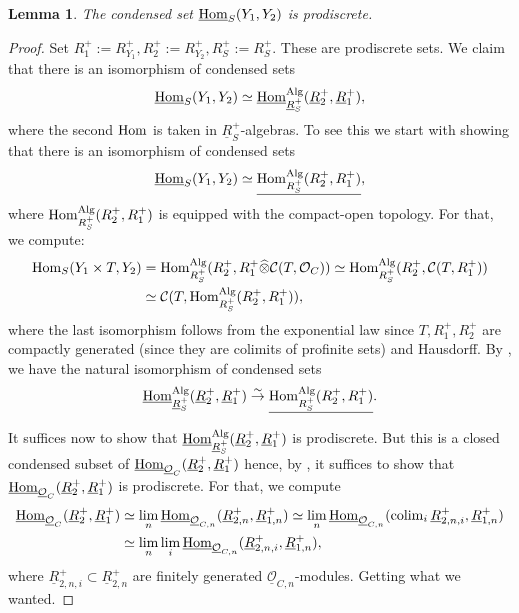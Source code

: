 \documentclass[10pt]{amsart}
\newtheorem{lemma}[equation]{Lemma}
\theoremstyle{definition}
\theoremstyle{remark}
\newcommand{\colim}{\operatorname{colim} }
\newcommand{\Hom}{{\rm{Hom}} }
\newcommand{\uHom}{\underline{{\rm{Hom}} }}
\newcommand{\scc}{{\mathcal{C}}}
\newcommand{\so}{{\mathcal O}}
\newcommand{\wh}{\widehat}
\numberwithin{equation}{section}
\numberwithin{equation}{section}
\begin{document}
\begin{lemma}\label{prodiscrete} 
The condensed set $ \uHom_S(Y_1,Y_2)$  is prodiscrete.
\end{lemma}
 \begin{proof}
 Set $R^+_1:= R^+_{Y_1}, R^+_2:= R^+_{Y_2}, R^+_S:= R^+_{S}$. These are prodiscrete sets. 
We claim that there is an isomorphism of condensed sets
 $$
  \uHom_S(Y_1,Y_2)\simeq   \underline{\Hom}_{\underline{R}^+_S}^{\rm Alg}(\underline{R}^+_2, \underline{R}^+_1),
 $$
 where the second $\Hom$ is taken in $\underline{R}^+_S$-algebras. 
 To see this we start with showing that  there is an isomorphism of condensed sets
 $$
   \uHom_S(Y_1,Y_2)\simeq  \underline{\Hom_{R^+_S}^{\rm Alg}(R^+_2, R^+_1)},
 $$
  where $ \Hom_{R^+_S}^{\rm Alg}(R^+_2, R^+_1)$ is equipped with the compact-open topology. For that, we compute:
 \begin{align*}
 \Hom_S(Y_1\times T,Y_2) & =\Hom_{R^+_S}^{\rm Alg}(R^+_2, R^+_1\wh{\otimes}\scc(T,\so_C))\simeq \Hom_{R^+_S}^{\rm Alg}(R^+_2, \scc(T,R^+_1))\\
  & \simeq \scc(T, \Hom_{R^+_S}^{\rm Alg}(R^+_2, R^+_1)),
 \end{align*}
  where  the last  isomorphism follows from the exponential law since $T, R^+_1, R^+_2$ are compactly generated  (since they are colimits of profinite sets) 
 and Hausdorff. 
By \cite[Prop. 4.2]{Sch19},  we have  the natural isomorphism of condensed sets $$
 \underline{\Hom}_{\underline{R}^+_S}^{\rm Alg}(\underline{R}^+_2, \underline{R}^+_1)\stackrel{\sim}{\to} 
 \underline{\Hom_{R^+_S}^{\rm Alg}(R^+_2, R^+_1)}.
 $$
 
  It suffices now to show that $\underline{\Hom}_{\underline{R}^+_S}^{\rm Alg}(\underline{R}^+_2, \underline{R}^+_1)$ is prodiscrete.   But this  is a closed condensed subset of 
  $ \uHom_{\underline{\so}_C}(\underline{R}^+_2,\underline{R}^+_1)$  hence, by \cite{MO},  it suffices to show that  $ \uHom_{\underline{\so}_C}(\underline{R}^+_2,\underline{R}^+_1)$ is prodiscrete. For that, we compute
 \begin{align*}
 \uHom_{\underline{\so}_C}(\underline{R}^+_2,\underline{R}^+_1) & \simeq \lim_n \uHom_{\underline{\so}_{C,n}}(\underline{R}^+_{2,n},\underline{R}^+_{1,n}) \simeq \lim_n \uHom_{\underline{\so}_{C,n}}(\colim_i\underline{R}^+_{2,n,i},\underline{R}^+_{1,n})\\
  & \simeq \lim_n \lim_i\uHom_{\underline{\so}_{C,n}}(\underline{R}^+_{2,n,i},\underline{R}^+_{1,n}),
 \end{align*}
 where $\underline{R}^+_{2,n,i}\subset \underline{R}^+_{2,n}$ are finitely generated  $\underline{\so}_{C,n}$-modules. 
 Getting what we wanted. 
 \end{proof}
\end{document}
